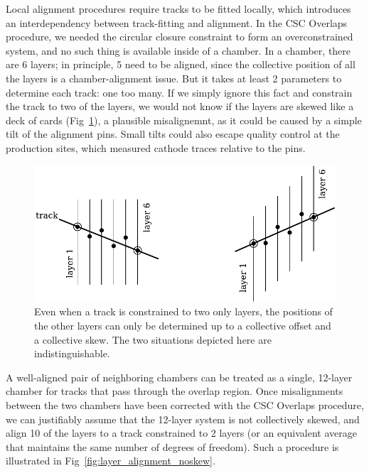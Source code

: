 \documentclass[12pt]{article}
\begin{document}
Local alignment procedures require tracks to be fitted locally, which
introduces an interdependency between track-fitting and alignment.  In
the CSC Overlaps procedure, we needed the circular closure constraint
to form an overconstrained system, and no such thing is available
inside of a chamber.  In a chamber, there are 6 layers; in principle,
5 need to be aligned, since the collective position of all the layers
is a chamber-alignment issue.  But it takes at least 2 parameters to
determine each track: one too many.  If we simply ignore this fact and
constrain the track to two of the layers, we would not know if the
layers are skewed like a deck of cards
(Fig~\ref{fig:layer_alignment_skew}), a plausible misalignemnt, as it
could be caused by a simple tilt of the alignment pins.  Small tilts
could also escape quality control at the production sites, which
measured cathode traces relative to the pins.

\begin{figure}
\begin{center}
\includegraphics[width=0.75\linewidth]{layer_alignment_skew.pdf}
\end{center}
\caption{Even when a track is constrained to two only layers, the positions of the other layers can only be determined up to a collective offset and a collective skew.  The two situations depicted here are indistinguishable. \label{fig:layer_alignment_skew}}
\end{figure}

A well-aligned pair of neighboring chambers can be treated as a
single, 12-layer chamber for tracks that pass through the overlap
region.  Once misalignments between the two chambers have been
corrected with the CSC Overlaps procedure, we can justifiably assume
that the 12-layer system is not collectively skewed, and align 10 of
the layers to a track constrained to 2 layers (or an equivalent
average that maintains the same number of degrees of freedom).  Such a
procedure is illustrated in Fig~\ref{fig:layer_alignment_noskew}.
\end{document}
